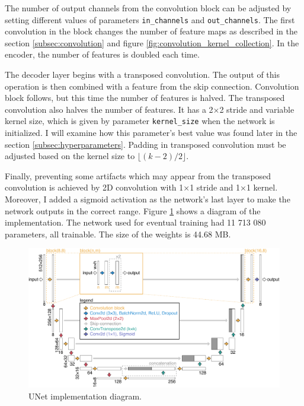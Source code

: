 The number of output channels from the convolution block can be adjusted by setting different values of parameters \texttt{in\_channels} and \texttt{out\_channels}. The first convolution in the block changes the number of feature maps as described in the section \ref{subsec:convolution} and figure \ref{fig:convolution_kernel_collection}. In the encoder, the number of features is doubled each time.

The decoder layer begins with a transposed convolution. The output of this operation is then combined with a feature from the skip connection. Convolution block follows, but this time the number of features is halved. The transposed convolution also halves the number of features. It has a 2×2 stride and variable kernel size, which is given by parameter \texttt{kernel\_size} when the network is initialized. I will examine how this parameter's best value was found later in the section \ref{subsec:hyperparameters}. Padding in transposed convolution must be adjusted based on the kernel size to $\lfloor (k - 2) / 2 \rfloor$.

Finally, preventing some artifacts which may appear from the transposed convolution is achieved by 2D convolution with 1×1 stride and 1×1 kernel. Moreover, I added a sigmoid activation as the network's last layer to make the network outputs in the correct range. Figure \ref{fig:my_unet_diagram} shows a diagram of the implementation. The network used for eventual training had 11 713 080 parameters, all trainable. The size of the weights is 44.68 MB.

\begin{figure}[ht]
    \centering
    \includegraphics[width=\textwidth]{images/my_unet_diagram.pdf}
    \caption[UNet implementation diagram]{\label{fig:my_unet_diagram}UNet implementation diagram.}
\end{figure}

